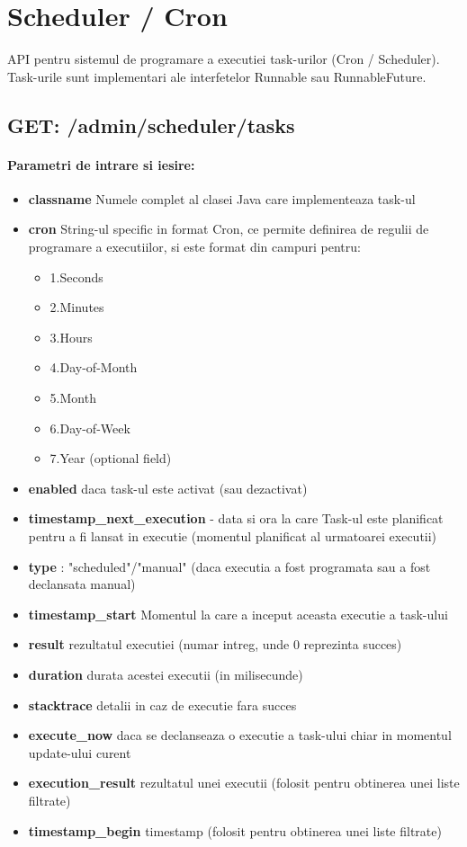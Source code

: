 
\section{Scheduler / Cron}

API pentru sistemul de programare a executiei task-urilor (Cron / Scheduler). Task-urile sunt implementari ale interfetelor Runnable sau RunnableFuture. \subsection*{GET: /admin/scheduler/tasks}

\paragraph{Parametri de intrare si iesire:}
\begin{itemize}
\item \textbf{classname}
 Numele complet al clasei Java care implementeaza task-ul
\item\textbf{cron}
 String-ul specific in format Cron, ce permite definirea de regulii de programare a executiilor, si este format din campuri pentru: \begin{itemize}
\item 1.Seconds
\item 2.Minutes
\item 3.Hours
\item 4.Day-of-Month
\item 5.Month
\item 6.Day-of-Week
\item 7.Year (optional field)
 \end{itemize}
\item \textbf{enabled}
 daca task-ul este activat (sau dezactivat)
\item \textbf{timestamp\_next\_execution}
 - data si ora la care Task-ul este planificat pentru a fi lansat in executie (momentul planificat al urmatoarei executii)
\item \textbf{type}
: "scheduled"/"manual" (daca executia a fost programata sau a fost declansata manual)
\item \textbf{timestamp\_start}
 Momentul la care a inceput aceasta executie a task-ului
\item \textbf{result}
 rezultatul executiei (numar intreg, unde 0 reprezinta succes)
\item \textbf{duration}
 durata acestei executii (in milisecunde)
\item \textbf{stacktrace}
 detalii in caz de executie fara succes
\item \textbf{execute\_now}
 daca se declanseaza o executie a task-ului chiar in momentul update-ului curent
\item \textbf{execution\_result}
 rezultatul unei executii (folosit pentru obtinerea unei liste filtrate)
\item \textbf{timestamp\_begin}
 timestamp (folosit pentru obtinerea unei liste filtrate)
 \end{itemize}

